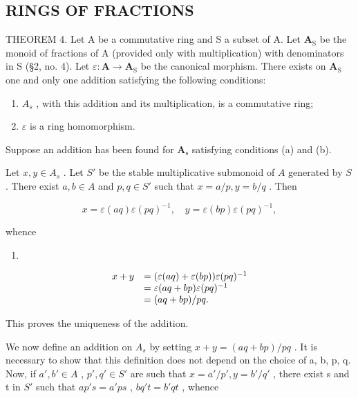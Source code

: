 \subsection{RINGS OF FRACTIONS}

THEOREM 4. Let A be a commutative ring and S a subset of A. Let \(\mathbf{A}_{\mathrm{S}}\) be the monoid of fractions of A (provided only with multiplication) with denominators in S (§2, no. 4). Let \(\varepsilon: \mathbf{A} \to \mathbf{A}_{\mathrm{S}}\) be the canonical morphism. There exists on \(\mathbf{A}_{\mathrm{S}}\) one and only one addition satisfying the following conditions:

\begin{enumerate}
\def\labelenumi{(\alph{enumi})}
\item
  \(A_{s}\) , with this addition and its multiplication, is a commutative ring;
\item
  \(\varepsilon\) is a ring homomorphism.
\end{enumerate}

Suppose an addition has been found for \(\mathbf{A}_{\mathrm{s}}\) satisfying conditions (a) and (b).

Let \(x, y \in A_s\) . Let \(S'\) be the stable multiplicative submonoid of \(A\) generated by \(S\) . There exist \(a, b \in A\) and \(p, q \in S'\) such that \(x = a/p, y = b/q\) . Then

\[
x = \varepsilon (a q) \varepsilon (p q) ^ {- 1}, \quad y = \varepsilon (b p) \varepsilon (p q) ^ {- 1},
\]

whence

\begin{enumerate}
\def\labelenumi{(\arabic{enumi})}
\setcounter{enumi}{22}
\tightlist
\item
\end{enumerate}

\[
\begin{array}{r l} x + y & = (\varepsilon (a q) + \varepsilon (b p)) \varepsilon (p q) ^ {- 1} \\ & = \varepsilon (a q + b p) \varepsilon (p q) ^ {- 1} \\ & = (a q + b p) / p q. \end{array}
\]

This proves the uniqueness of the addition.

We now define an addition on \(A_{s}\) by setting \(x + y = (aq + bp)/pq\) . It is necessary to show that this definition does not depend on the choice of a, b, p, q. Now, if \(a', b' \in A\) , \(p', q' \in S'\) are such that \(x = a'/p', y = b'/q'\) , there exist s and t in \(S'\) such that \(ap's = a'ps\) , \(bq't = b'qt\) , whence

